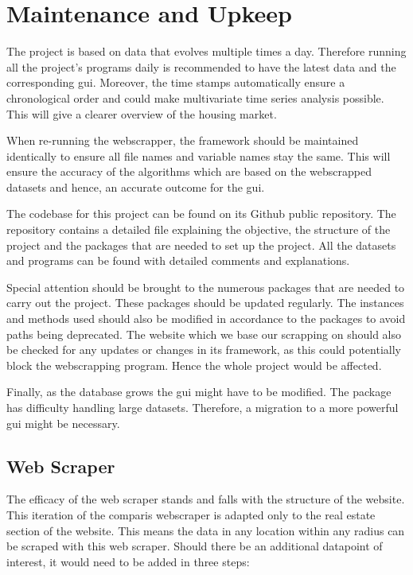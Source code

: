 \documentclass[main]{subfiles}
\begin{document}
\section{Maintenance and Upkeep}

The project is based on data that evolves multiple times a day. 
Therefore running all the project's programs daily is recommended to have the latest data and the corresponding \ac{gui}. 
Moreover, the time stamps automatically ensure a chronological order and could make multivariate time series analysis possible.
This will give a clearer overview of the housing market. \par
When re-running the webscrapper, the framework should be maintained identically to ensure all file names and variable names stay the same. 
This will ensure the accuracy of the algorithms which are based on the webscrapped datasets and hence, an accurate outcome for the \ac{gui}. \par
The codebase for this project can be found on its Github public repository. 
The repository contains a detailed \pkg[readme.md] file explaining the objective, 
the structure of the project and the packages that are needed to set up the project. 
All the datasets and programs can be found with detailed comments and explanations.\par
Special attention should be brought to the numerous packages that are needed to carry out the project. 
These packages should be updated regularly. 
The instances and methods used should also be modified in accordance to the packages to avoid paths being deprecated.
The website which we base our scrapping on should also be checked for any updates or changes in its framework, 
as this could potentially block the webscrapping program. Hence the whole project would be affected.\par
Finally, as the database grows the \ac{gui} might have to be modified. 
The \pkg[tkinter] package has difficulty handling large datasets.
Therefore, a migration to a more powerful \ac{gui} might be necessary.

\subsection{Web Scraper}
The efficacy of the web scraper stands and falls with the structure of the website.
This iteration of the comparis webscraper is adapted only to the real estate section of the website.
This means the data in any location within any radius can be scraped with this web scraper.
Should there be an additional datapoint of interest,
it would need to be added in three steps:
\end{document}

